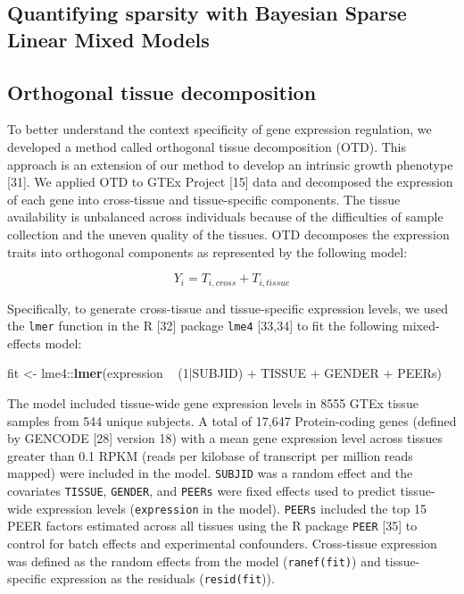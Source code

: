 \documentclass[]{article}
\newenvironment{Shaded}{\begin{snugshade}}{\end{snugshade}}
\newcommand{\KeywordTok}[1]{\textcolor[rgb]{0.13,0.29,0.53}{\textbf{{#1}}}}
\newcommand{\DecValTok}[1]{\textcolor[rgb]{0.00,0.00,0.81}{{#1}}}
\newcommand{\StringTok}[1]{\textcolor[rgb]{0.31,0.60,0.02}{{#1}}}
\newcommand{\NormalTok}[1]{{#1}}
\begin{document}
\subsection{Quantifying sparsity with Bayesian Sparse Linear Mixed
Models}\label{quantifying-sparsity-with-bayesian-sparse-linear-mixed-models}

\subsection{Orthogonal tissue
decomposition}\label{orthogonal-tissue-decomposition}

To better understand the context specificity of gene expression
regulation, we developed a method called orthogonal tissue decomposition
(OTD). This approach is an extension of our method to develop an
intrinsic growth phenotype {[}31{]}. We applied OTD to GTEx Project
{[}15{]} data and decomposed the expression of each gene into
cross-tissue and tissue-specific components. The tissue availability is
unbalanced across individuals because of the difficulties of sample
collection and the uneven quality of the tissues. OTD decomposes the
expression traits into orthogonal components as represented by the
following model:

\[ Y_i = T_{i,cross} + T_{i,tissue} \]

Specifically, to generate cross-tissue and tissue-specific expression
levels, we used the \texttt{lmer} function in the R {[}32{]} package
\texttt{lme4} {[}33,34{]} to fit the following mixed-effects model:

\begin{Shaded}
\begin{Highlighting}[]
\NormalTok{fit <-}\StringTok{ }\NormalTok{lme4::}\KeywordTok{lmer}\NormalTok{(expression ~}\StringTok{ }\NormalTok{(}\DecValTok{1}\NormalTok{|SUBJID) +}\StringTok{ }\NormalTok{TISSUE +}\StringTok{ }\NormalTok{GENDER +}\StringTok{ }\NormalTok{PEERs)}
\end{Highlighting}
\end{Shaded}

The model included tissue-wide gene expression levels in 8555 GTEx
tissue samples from 544 unique subjects. A total of 17,647
Protein-coding genes (defined by GENCODE {[}28{]} version 18) with a
mean gene expression level across tissues greater than 0.1 RPKM (reads
per kilobase of transcript per million reads mapped) were included in
the model. \texttt{SUBJID} was a random effect and the covariates
\texttt{TISSUE}, \texttt{GENDER}, and \texttt{PEERs} were fixed effects
used to predict tissue-wide expression levels (\texttt{expression} in
the model). \texttt{PEERs} included the top 15 PEER factors estimated
across all tissues using the R package \texttt{PEER} {[}35{]} to control
for batch effects and experimental confounders. Cross-tissue expression
was defined as the random effects from the model (\texttt{ranef(fit)})
and tissue-specific expression as the residuals (\texttt{resid(fit})).
\end{document}
